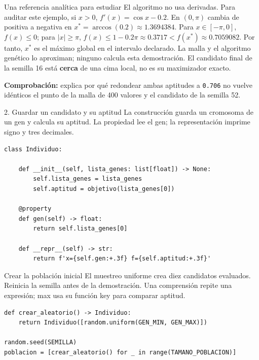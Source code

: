 \begin{frame}[fragile]{Una referencia analítica para estudiar}
El algoritmo no usa derivadas. Para auditar este ejemplo, si $x>0$,
$f'(x)=\cos x-0.2$. En $(0,\pi)$ cambia de positiva a negativa en
$x^*=\arccos(0.2)\approx1.3694384$.
Para $x\in[-\pi,0]$, $f(x)\le0$; para $|x|\ge\pi$,
$f(x)\le1-0.2\pi\approx0.3717<f(x^*)\approx0.7059082$.
Por tanto, $x^*$ es el máximo global en el intervalo declarado. La malla y el
algoritmo genético lo aproximan; ninguno calcula esta demostración.
El candidato final de la semilla 16 está \textbf{cerca} de una cima local, no es su
maximizador exacto.

\textbf{Comprobación:} explica por qué redondear ambas aptitudes a \texttt{0.706} no vuelve
idénticos el punto de la malla de 400 valores y el candidato de la semilla 52.
\end{frame}

\begin{frame}[fragile]{2. Guardar un candidato y su aptitud}
La construcción guarda un cromosoma de un gen y calcula su aptitud. La propiedad lee el gen; la representación imprime signo y tres decimales.

\begin{lstlisting}
class Individuo:

    def __init__(self, lista_genes: list[float]) -> None:
        self.lista_genes = lista_genes
        self.aptitud = objetivo(lista_genes[0])

    @property
    def gen(self) -> float:
        return self.lista_genes[0]

    def __repr__(self) -> str:
        return f'x={self.gen:+.3f} f={self.aptitud:+.3f}'
\end{lstlisting}
\end{frame}

\begin{frame}[fragile]{Crear la población inicial}
El muestreo uniforme crea diez candidatos evaluados. Reinicia la semilla antes de la demostración. Una comprensión repite una expresión; max usa su función key para comparar aptitud.

\begin{lstlisting}
def crear_aleatorio() -> Individuo:
    return Individuo([random.uniform(GEN_MIN, GEN_MAX)])

random.seed(SEMILLA)
poblacion = [crear_aleatorio() for _ in range(TAMANO_POBLACION)]
\end{lstlisting}
\end{frame}

